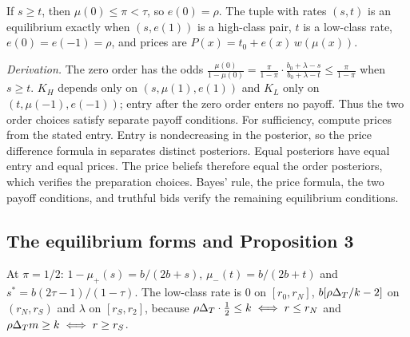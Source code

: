\begin{resultbox}
If \(s\ge t\), then \(\mu(0)\le\pi<\tau\), so \(e(0)=\rho\). The tuple with rates \((s,t)\) is an equilibrium exactly when
\((s,e(1))\) is a high-class pair, \(t\) is a low-class rate, \(e(0)=e(-1)=\rho\), and prices are
\(P(x)=t_0+e(x)\,w(\mu(x))\).
\end{resultbox}
\emph{Derivation.} The zero order has the odds
\(\frac{\mu(0)}{1-\mu(0)}=\frac{\pi}{1-\pi}\cdot\frac{b_0+\lambda-s}{b_0+\lambda-t}\le\frac{\pi}{1-\pi}\) when \(s\ge t\).
\(K_H\) depends only on \((s,\mu(1),e(1))\) and \(K_L\) only on \((t,\mu(-1),e(-1))\); entry after the zero order enters
no payoff. Thus the two order choices satisfy separate payoff conditions.
For sufficiency, compute prices from the stated entry.
Entry is nondecreasing in the posterior, so the price difference formula in  separates distinct posteriors.
Equal posteriors have equal entry and equal prices.
The price beliefs therefore equal the order posteriors, which verifies the preparation choices.
Bayes' rule, the price formula, the two payoff conditions, and truthful bids verify the remaining equilibrium conditions.

\subsection{The equilibrium forms and Proposition 3}\label{sec:08_coexistence-set}

At \(\pi=1/2\): \(1-\mu_+(s)=b/(2b+s)\), \(\mu_-(t)=b/(2b+t)\) and \(s^*=b(2\tau-1)/(1-\tau)\). The low-class rate is
\(0\) on \([r_0,r_N]\), \(b[\rho\Delta_T/k-2]\) on \((r_N,r_S)\) and \(\lambda\) on \([r_S,r_2]\), because
\(\rho\Delta_T\cdot\tfrac12\le k\iff r\le r_N\) and \(\rho\Delta_T m\ge k\iff r\ge r_S\).

